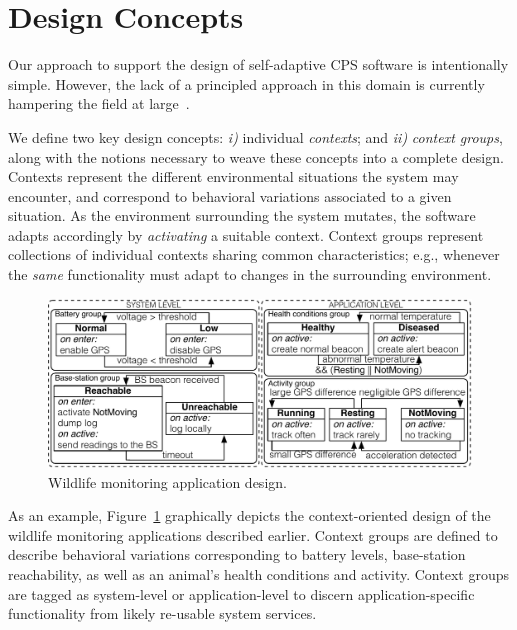 \section{Design Concepts}
\label{sec:design}

Our approach to support the design of self-adaptive CPS software is
intentionally simple. However, the lack of a principled approach in
this domain is currently hampering the field at
large~\cite{Picco:2010:SEW:1882362.1882421}. %

We define two key design concepts: \emph{i)} individual
\emph{contexts}; and \emph{ii)} \emph{context groups}, along with the
notions necessary to weave these concepts into a complete design.
Contexts represent the different environmental situations the system
may encounter, and correspond to behavioral variations associated to a
given situation. As the environment surrounding the system mutates,
the software adapts accordingly by \emph{activating} a suitable
context. Context groups represent collections of individual contexts
sharing common characteristics; e.g., whenever the \emph{same}
functionality must adapt to changes in the surrounding environment.

\begin{figure}
\begin{center}
\includegraphics[scale=.45]{imgs/wildlifetracking}
\vspace{-4mm}
\caption{Wildlife monitoring application design.}
  \label{fig:design}
\vspace{-6mm}
\end{center}
\end{figure}

As an example, Figure~\ref{fig:design} graphically depicts the
context-oriented design of the wildlife monitoring applications
described earlier. Context groups are defined to describe behavioral
variations corresponding to battery levels, base-station reachability,
as well as an animal's health conditions and activity. Context groups
are tagged as system-level or application-level to discern
application-specific functionality from likely re-usable system
services.

